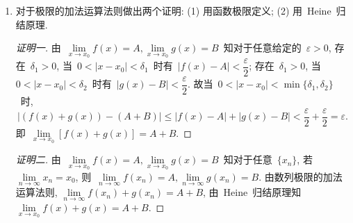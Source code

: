 \documentclass[UTF8,a4paper,11pt,twoside]{book}
\begin{document}
\begin{enumerate}
	\item 对于极限的加法运算法则做出两个证明: (1) 用函数极限定义; (2) 用~Heine~归结原理.
	      \begin{proof}[证明一]
		      由~$\lim\limits_{x\to x_0} f(x)=A, \lim\limits_{x\to x_0} g(x)=B$~知对于任意给定的~$\varepsilon>0$, 存在~$\delta_1>0$, 当~$0<|x-x_0|<\delta_1$~时有~$|f(x)-A|<\dfrac{\varepsilon}{2}$; 存在~$\delta_1>0$, 当~$0<|x-x_0|<\delta_2$~时有~$|g(x)-B|<\dfrac{\varepsilon}{2}$. 故当~$0<|x-x_0|<\min\{\delta_1,\delta_2\}$~时,
		      \[
			      |(f(x)+g(x))-(A+B)|\leqslant |f(x)-A|+|g(x)-B|<\dfrac{\varepsilon}{2}+\dfrac{\varepsilon}{2}=\varepsilon.
		      \]
		      即~$\lim\limits_{x\to x_0} [f(x)+g(x)]=A+B$. \qedhere
	      \end{proof}
	      \begin{proof}[证明二]
		      由~$\lim\limits_{x\to x_0} f(x)=A, \lim\limits_{x\to x_0} g(x)=B$~知对于任意~$\{x_n\}$, 若~$\lim\limits_{n\to\infty} x_n=x_0$, 则~$\lim\limits_{n\to\infty} f(x_n)=A, \lim\limits_{n\to\infty} g(x_n)=B$. 由数列极限的加法运算法则, $\lim\limits_{n\to\infty} f(x_n)+g(x_n)=A+B$, 由~Heine~归结原理知~$\lim\limits_{x\to x_0} f(x)+g(x)=A+B$. \qedhere
	      \end{proof}
\end{enumerate}
\end{document}
